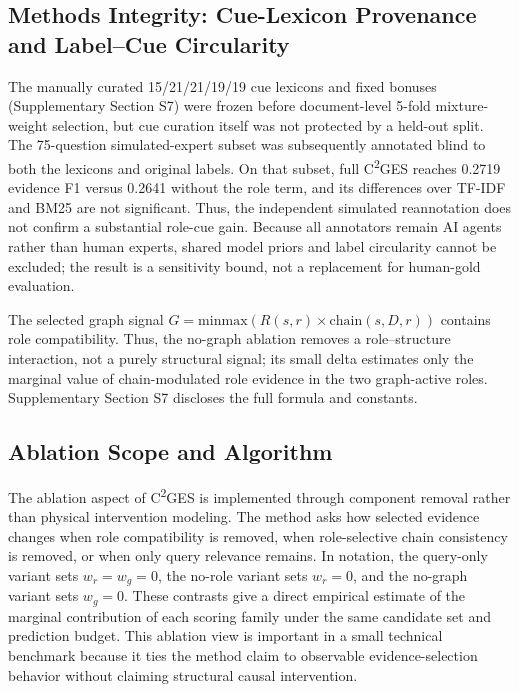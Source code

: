 \documentclass{article}
\begin{document}
\subsection{Methods Integrity: Cue-Lexicon Provenance and Label--Cue Circularity}
\label{sec:methods_integrity}

The manually curated 15/21/21/19/19 cue lexicons and fixed bonuses (Supplementary Section S7) were frozen before document-level 5-fold mixture-weight selection, but cue curation itself was not protected by a held-out split. The 75-question simulated-expert subset was subsequently annotated blind to both the lexicons and original labels. On that subset, full C\textsuperscript{2}GES reaches 0.2719 evidence F1 versus 0.2641 without the role term, and its differences over TF-IDF and BM25 are not significant. Thus, the independent simulated reannotation does not confirm a substantial role-cue gain. Because all annotators remain AI agents rather than human experts, shared model priors and label circularity cannot be excluded; the result is a sensitivity bound, not a replacement for human-gold evaluation.

The selected graph signal $G=\mathrm{minmax}(R(s,r)\times \mathrm{chain}(s,D,r))$ contains role compatibility. Thus, the no-graph ablation removes a role--structure interaction, not a purely structural signal; its small delta estimates only the marginal value of chain-modulated role evidence in the two graph-active roles. Supplementary Section S7 discloses the full formula and constants.

\subsection{Ablation Scope and Algorithm}
\label{sec:ablation_scope}

The ablation aspect of C\textsuperscript{2}GES is implemented through component removal rather than physical intervention modeling. The method asks how selected evidence changes when role compatibility is removed, when role-selective chain consistency is removed, or when only query relevance remains. In notation, the query-only variant sets $w_r=w_g=0$, the no-role variant sets $w_r=0$, and the no-graph variant sets $w_g=0$. These contrasts give a direct empirical estimate of the marginal contribution of each scoring family under the same candidate set and prediction budget. This ablation view is important in a small technical benchmark because it ties the method claim to observable evidence-selection behavior without claiming structural causal intervention.
\end{document}

